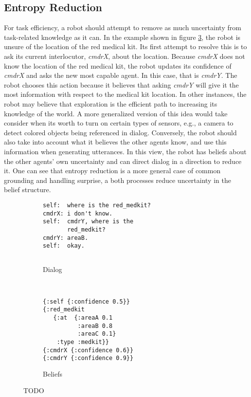 \documentclass[12pt]{article}
\begin{document}
\subsection{Entropy Reduction}

For task efficiency, a robot should attempt to remove as much
uncertainty from task-related knowledge as it can. In the example
shown in figure \ref{fig:er}, the robot is unsure of the location of
the red medical kit. Its first attempt to resolve this is to ask its
current interlocutor, \textit{cmdrX}, about the location. Because
\textit{cmdrX} does not know the location of the red medical kit, the
robot updates its confidence of \textit{cmdrX} and asks the new most
capable agent. In this case, that is \textit{cmdrY}. The robot chooses
this action because it believes that asking \textit{cmdrY} will give
it the most information with respect to the medical kit location. In
other instances, the robot may believe that exploration is the
efficient path to increasing its knowledge of the world. A more
generalized version of this idea would take consider when its worth to
turn on certain types of sensors, e.g., a camera to detect colored
objects being referenced in dialog. Conversely, the robot should also
take into account what it believes the other agents know, and use this
information when generating utterances. In this view, the robot has
beliefs about the other agents' own uncertainty and can direct dialog
in a direction to reduce it. One can see that entropy reduction is a
more general case of common grounding and handling surprise, a both
processes reduce uncertainty in the belief structure.

\begin{figure}[h]
  \centering
  \begin{subfigure}[t]{0.4\textwidth}
    \centering
\begin{verbatim}
self:  where is the red_medkit?
cmdrX: i don't know.
self:  cmdrY, where is the
       red_medkit?
cmdrY: areaB.
self:  okay.


\end{verbatim}
    \label{fig:er_text}
    \caption{Dialog}
  \end{subfigure}
  ~\qquad\qquad
  \begin{subfigure}[t]{0.4\textwidth}
    \centering
\begin{verbatim}
{:self {:confidence 0.5}}
{:red_medkit
   {:at  {:areaA 0.1
          :areaB 0.8
          :areaC 0.1}
    :type :medkit}}
{:cmdrX {:confidence 0.6}}
{:cmdrY {:confidence 0.9}}
\end{verbatim}
    \label{fig:er_beliefs}
    \caption{Beliefs}
  \end{subfigure}
  \caption{TODO}
  \label{fig:er}
\end{figure}
\end{document}

